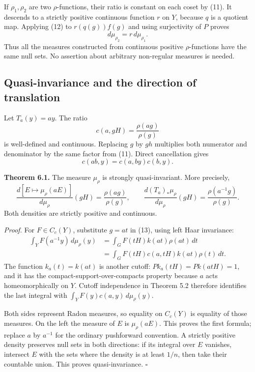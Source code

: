 \documentclass[
  english,
  11pt,
  a4paper,
]{article}
\begin{document}
If \(\rho_1,\rho_2\) are two \(\rho\)-functions, their ratio is constant
on each coset by (11). It descends to a strictly positive continuous
function \(r\) on \(Y\), because \(q\) is a quotient map. Applying (12)
to \(r(q(g))f(g)\) and using surjectivity of \(P\) proves
\[d\mu_{\rho_2}=r\,d\mu_{\rho_1}.
\tag{15}\] Thus all the measures constructed from continuous positive
\(\rho\)-functions have the same null sets. No assertion about arbitrary
non-regular measures is needed.

\subsection{Quasi-invariance and the direction of
translation}\label{quotient-measures-and-weils-integration-formula--quasi-invariance-and-the-direction-of-translation}

Let \(T_a(y)=ay\). The ratio \[c(a,gH)=\frac{\rho(ag)}{\rho(g)}
\tag{16}\] is well-defined and continuous. Replacing \(g\) by \(gh\)
multiplies both numerator and denominator by the same factor from (11).
Direct cancellation gives \[c(ab,y)=c(a,by)c(b,y).
\tag{17}\]

\textbf{Theorem 6.1.} The measure \(\mu_\rho\) is strongly
quasi-invariant. More precisely,
\[\frac{d[E\mapsto\mu_\rho(aE)]}{d\mu_\rho}(gH)
=\frac{\rho(ag)}{\rho(g)},\qquad
\frac{d(T_a)_*\mu_\rho}{d\mu_\rho}(gH)
=\frac{\rho(a^{-1}g)}{\rho(g)}.
\tag{18}\] Both densities are strictly positive and continuous.

\emph{Proof.} For \(F\in C_c(Y)\), substitute \(g=at\) in (13), using
left Haar invariance: \[\begin{aligned}
\int_Y F(a^{-1}y)\,d\mu_\rho(y)
&=\int_G F(tH)k(at)\rho(at)\,dt\\
&=\int_G F(tH)c(a,tH)k(at)\rho(t)\,dt.
\end{aligned}\] The function \(k_a(t)=k(at)\) is another cutoff:
\(Pk_a(tH)=Pk(atH)=1\), and it has the compact-support-over-compacts
property because \(a\) acts homeomorphically on \(Y\). Cutoff
independence in Theorem 5.2 therefore identifies the last integral with
\(\int_Y F(y)c(a,y)\,d\mu_\rho(y)\).

Both sides represent Radon measures, so equality on \(C_c(Y)\) is
equality of those measures. On the left the measure of \(E\) is
\(\mu_\rho(aE)\). This proves the first formula; replace \(a\) by
\(a^{-1}\) for the ordinary pushforward convention. A strictly positive
density preserves null sets in both directions: if its integral over
\(E\) vanishes, intersect \(E\) with the sets where the density is at
least \(1/n\), then take their countable union. This proves
quasi-invariance. \(\square\)
\end{document}
